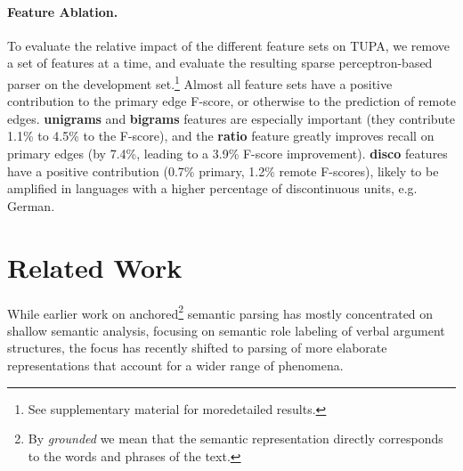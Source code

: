 \documentclass[11pt]{article}
\newcommand{\parser}[1]{TUPA\textsubscript{#1}}
\begin{document}
\paragraph{Feature Ablation.}
To evaluate the relative impact of the different feature sets on \parser{},
we remove a set of features at a time, and evaluate the
resulting sparse perceptron-based parser on the development set.\footnote{See
supplementary material for moredetailed results.}
Almost all feature sets have a positive contribution to the primary
edge F-score, or otherwise to the prediction of remote edges.
\textbf{unigrams} and \textbf{bigrams} features are especially
important (they contribute 1.1\% to 4.5\% to the F-score),
and the \textbf{ratio} feature greatly improves recall on
primary edges (by 7.4\%, leading to  a 3.9\% F-score improvement).
\textbf{disco} features have a positive contribution
(0.7\% primary, 1.2\% remote F-scores),
likely to be amplified in languages with a higher percentage of
discontinuous units, e.g. German.




\section{Related Work}\label{sec:related_work}

While earlier work on anchored\footnote{By {\it grounded} we mean that the semantic representation
  directly corresponds to the words and phrases of the text.} semantic parsing has mostly concentrated on shallow semantic analysis,
focusing on semantic role labeling of verbal argument structures,
the focus has recently shifted to parsing of more elaborate representations that account
for a wider range of phenomena.
\end{document}
